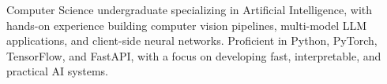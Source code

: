 Computer Science undergraduate specializing in Artificial Intelligence, with hands-on experience building computer vision pipelines, multi-model LLM applications, and client-side neural networks. Proficient in Python, PyTorch, TensorFlow, and FastAPI, with a focus on developing fast, interpretable, and practical AI systems.
